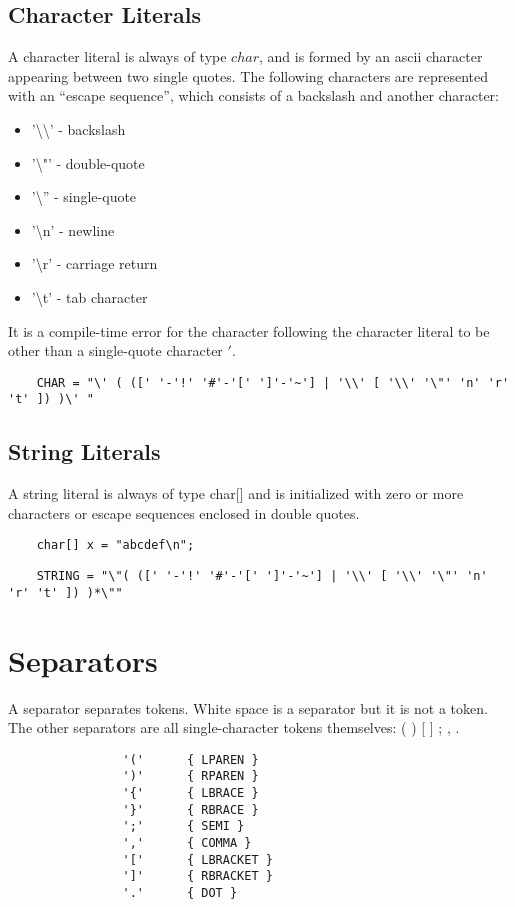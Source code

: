 \begin{homeworkProblem}
	\subsection{Character Literals}
	A character literal is always of type $char$, and is formed by an ascii character appearing between two single quotes. The following characters are represented with an “escape sequence”, which consists of a backslash and another character:\\
	\begin{itemize}
		\item '\textbackslash\textbackslash' - backslash
		\item '\textbackslash"' - double-quote
		\item '\textbackslash'' - single-quote
		\item '\textbackslash n' - newline
		\item '\textbackslash r' - carriage return
		\item '\textbackslash t' - tab character
	\end{itemize}
	It is a compile-time error for the character following the character literal to be other than a single-quote character $'$.
	
	\begin{verbatim}
	CHAR = "\' ( ([' '-'!' '#'-'[' ']'-'~'] | '\\' [ '\\' '\"' 'n' 'r' 't' ]) )\' "
	\end{verbatim}
	
	
	\subsection{String Literals}
	A string literal is always of type char[] and is initialized with zero or more characters or escape sequences enclosed in double quotes.
    \begin{verbatim}
	char[] x = "abcdef\n";
    \end{verbatim}
	
	\begin{verbatim}
	STRING = "\"( ([' '-'!' '#'-'[' ']'-'~'] | '\\' [ '\\' '\"' 'n' 'r' 't' ]) )*\""
	\end{verbatim}
	
	\section{Separators}
	A separator separates tokens. White space is a separator but it is not a token. The other separators are all single-character tokens themselves:
	     ( ) [ ] { } ; , .
	\begin{verbatim}
				'('      { LPAREN }
				')'      { RPAREN }
				'{'      { LBRACE }
				'}'      { RBRACE }
				';'      { SEMI }
				','      { COMMA }
				'['      { LBRACKET }
				']'      { RBRACKET }
				'.'      { DOT }
 	\end{verbatim}
 	

\end{homeworkProblem}
